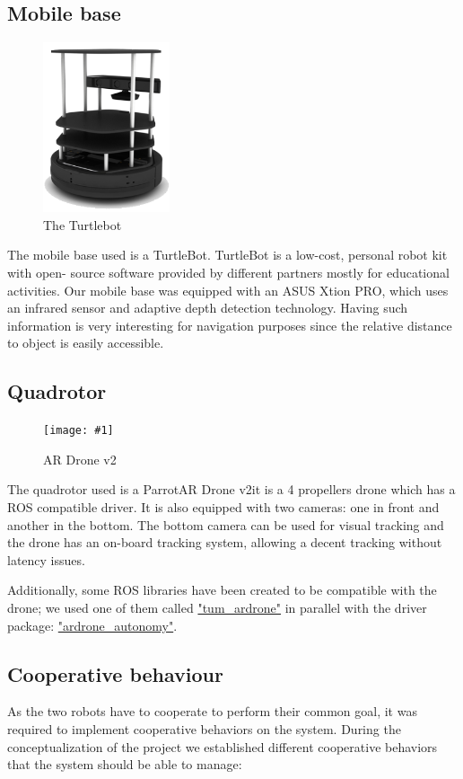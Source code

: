 \documentclass[11pt,a4paper]{article}
\newcommand{\centerFigure}[2]{
\begin{figure}[h]	
\centering
\texttt{[image: \#1]}
\caption{#2}
\end{figure}
}
\begin{document}
\subsection{Mobile base}

\begin{figure}[h]	
\centering
\includegraphics[height=5cm]{turtlebot.png}
\caption{The Turtlebot}
\end{figure}

The mobile base used is a TurtleBot. TurtleBot is a low-cost, personal robot kit with open-
source software
provided by different partners mostly for educational activities.
Our mobile base was equipped with an ASUS Xtion PRO, which uses an infrared sensor and adaptive depth detection technology. Having such information is very interesting for 
navigation
purposes since the relative distance to object is easily accessible.

\subsection{Quadrotor}
\centerFigure{arDroneGpsEdition.png}{AR Drone v2}

The quadrotor used is a Parrot\textcopyright AR Drone v2\texttrademark it is a 4 propellers
drone which has a ROS compatible driver. It is also equipped with two cameras: one in front
and another in the bottom. The bottom camera can be used for visual tracking and the drone
has an on-board tracking system, allowing a decent tracking without latency issues.

Additionally, some ROS libraries have been created to be compatible with the drone; we used
one of them called \href{"http://wiki.ros.org/tum_ardrone"}{"tum\_ardrone"} in parallel with
the driver package: \href{"https://github.com/AutonomyLab/ardrone_autonomy"}
{"ardrone\_autonomy"}.

\subsection{Cooperative behaviour}
As the two robots have to cooperate to perform their common goal, it was required to implement
cooperative behaviors on the system. During the conceptualization of the project we established different
cooperative behaviors that the system should be able to manage:
\end{document}
